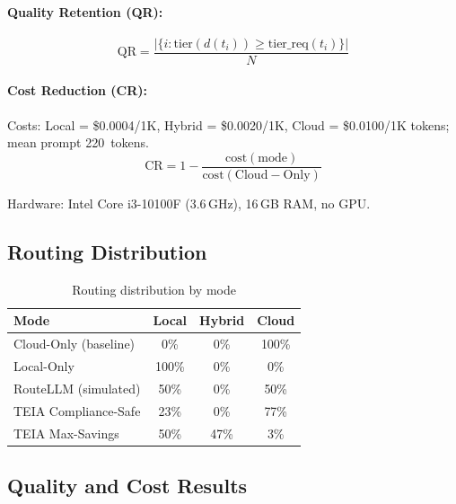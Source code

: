 \documentclass[11pt,a4paper]{article}
\newcommand{\teia}{\textsc{TEIA}}
\begin{document}
\paragraph{Quality Retention (QR):}
\begin{equation}
  \mathrm{QR} = \frac{|\{i : \mathrm{tier}(d(t_i)) \geq
    \mathrm{tier\_req}(t_i)\}|}{N}
\end{equation}

\paragraph{Cost Reduction (CR):}
Costs: Local = \$0.0004/1K, Hybrid = \$0.0020/1K, Cloud = \$0.0100/1K tokens;
mean prompt 220~tokens.
\begin{equation}
  \mathrm{CR} = 1 - \frac{\mathrm{cost}(\mathrm{mode})}{\mathrm{cost}(\mathrm{Cloud{-}Only})}
\end{equation}

Hardware: Intel Core i3-10100F (3.6\,GHz), 16\,GB RAM, no GPU.

\subsection{Routing Distribution}

\begin{table}[h]
\centering
\caption{Routing distribution by mode}
\label{tab:distribution}
\begin{tabular}{@{}lccc@{}}
\toprule
Mode & Local & Hybrid & Cloud \\
\midrule
Cloud-Only (baseline)    &  0\% &  0\% & 100\% \\
Local-Only               & 100\% & 0\% &   0\% \\
RouteLLM (simulated)     & 50\% &  0\% &  50\% \\
\teia{} Compliance-Safe  & 23\% &  0\% &  77\% \\
\teia{} Max-Savings      & 50\% & 47\% &   3\% \\
\bottomrule
\end{tabular}
\end{table}

\subsection{Quality and Cost Results}
\end{document}

